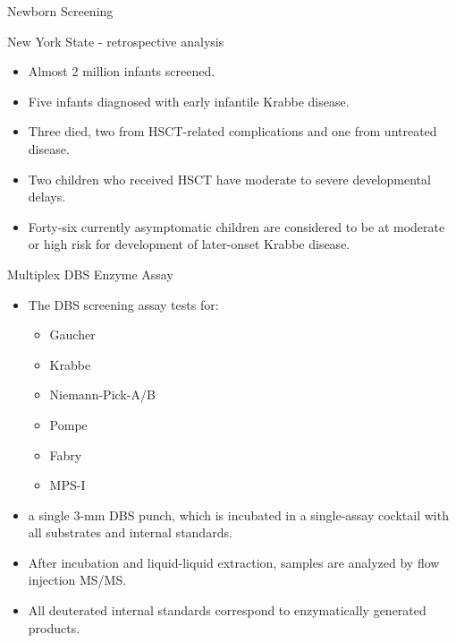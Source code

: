 \documentclass[presentation, smaller]{beamer}
\begin{document}
\begin{frame}[label={sec:org1c9b09c}]{Newborn Screening}
\begin{block}{New York State - retrospective analysis}
\begin{itemize}
\item Almost 2 million infants screened.
\item Five infants diagnosed with early infantile Krabbe disease.
\item Three died, two from HSCT-related complications and one from untreated disease.
\item Two children who received HSCT have moderate to severe developmental delays.
\item Forty-six currently asymptomatic children are considered to be at
moderate or high risk for development of later-onset Krabbe disease.
\end{itemize}
\end{block}
\end{frame}


\begin{frame}[label={sec:orgea5222a}]{Multiplex DBS  Enzyme Assay}
\begin{itemize}
\item The DBS screening assay tests for:
\begin{itemize}
\item Gaucher
\item Krabbe
\item Niemann-Pick-A/B
\item Pompe
\item Fabry
\item MPS-I
\end{itemize}
\item a single 3-mm DBS punch, which is incubated in a single-assay
cocktail with all substrates and internal standards.
\item After incubation and liquid-liquid extraction, samples are analyzed by flow injection MS/MS.
\item All deuterated internal standards correspond to enzymatically generated products.
\end{itemize}
\end{frame}
\end{document}
